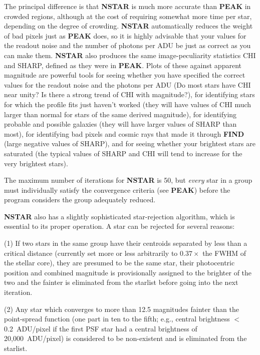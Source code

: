 \noindent The principal difference is that {\bf NSTAR} is much more
accurate than {\bf PEAK} in crowded regions, although at the cost of
requiring somewhat more time per star, depending on the degree of
crowding. {\bf NSTAR} automatically reduces the weight of bad pixels
just as {\bf PEAK} does, so it is highly advisable that your values for
the readout noise and the number of photons per ADU be just as correct
as you can make them.  {\bf NSTAR} also produces the same
image-peculiarity statistics CHI and SHARP, defined as they were in
{\bf PEAK}.  Plots of these against apparent magnitude are powerful
tools for seeing whether you have specified the correct values for the
readout noise and the photons per ADU (Do most stars have CHI near
unity?  Is there a strong trend of CHI with magnitude?), for
identifying stars for which the profile fits just haven't worked (they
will have values of CHI much larger than normal for stars of the same
derived magnitude), for identifying probable and possible galaxies
(they will have larger values of SHARP than most), for identifying bad
pixels and cosmic rays that made it through {\bf FIND} (large negative
values of SHARP), and for seeing whether your brightest stars are
saturated (the typical values of SHARP and CHI will tend to increase
for the very brightest stars).

The maximum number of iterations for {\bf NSTAR} is 50, but {\it every}
star in a group must individually satisfy the convergence criteria (see
{\bf PEAK}) before the program considers the group adequately reduced.

{\bf NSTAR} also has a slightly sophisticated star-rejection algorithm,
which is essential to its proper operation.  A star can be rejected for
several reasons:

\item{(1)}  If two stars in the same group have their centroids
separated by less than a critical distance (currently set more or less
arbitrarily to $0.37 \times$  the FWHM of the stellar core), they are
presumed to be the same star, their photocentric position and combined
magnitude is provisionally assigned to the brighter of the two and the
fainter is eliminated from the starlist before going into the next
iteration.

\item{(2)}  Any star which converges to more than 12.5 magnitudes
fainter than the point-spread function (one part in ten to the fifth;
e.g., central brightness $<$ 0.2~ADU/pixel if the first PSF star had a
central brightness of 20,000~ADU/pixel) is considered to be
non-existent and is eliminated from the starlist.

